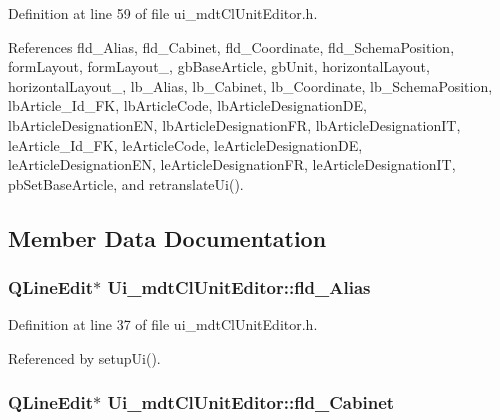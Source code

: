 Definition at line 59 of file ui\-\_\-mdt\-Cl\-Unit\-Editor.\-h.



References fld\-\_\-\-Alias, fld\-\_\-\-Cabinet, fld\-\_\-\-Coordinate, fld\-\_\-\-Schema\-Position, form\-Layout, form\-Layout\-\_, gb\-Base\-Article, gb\-Unit, horizontal\-Layout, horizontal\-Layout\-\_, lb\-\_\-\-Alias, lb\-\_\-\-Cabinet, lb\-\_\-\-Coordinate, lb\-\_\-\-Schema\-Position, lb\-Article\-\_\-\-Id\-\_\-\-F\-K, lb\-Article\-Code, lb\-Article\-Designation\-D\-E, lb\-Article\-Designation\-E\-N, lb\-Article\-Designation\-F\-R, lb\-Article\-Designation\-I\-T, le\-Article\-\_\-\-Id\-\_\-\-F\-K, le\-Article\-Code, le\-Article\-Designation\-D\-E, le\-Article\-Designation\-E\-N, le\-Article\-Designation\-F\-R, le\-Article\-Designation\-I\-T, pb\-Set\-Base\-Article, and retranslate\-Ui().



\subsection{Member Data Documentation}
\hypertarget{class_ui__mdt_cl_unit_editor_a1cc230a41daf066bb90d542c4618b8e5}{
\subsubsection[{fld\-\_\-\-Alias}]{\setlength{\rightskip}{0pt plus 5cm}Q\-Line\-Edit$\ast$ Ui\-\_\-mdt\-Cl\-Unit\-Editor\-::fld\-\_\-\-Alias}}\label{class_ui__mdt_cl_unit_editor_a1cc230a41daf066bb90d542c4618b8e5}


Definition at line 37 of file ui\-\_\-mdt\-Cl\-Unit\-Editor.\-h.



Referenced by setup\-Ui().

\hypertarget{class_ui__mdt_cl_unit_editor_a3f3a78ce3859fd6ab6bc260b5d8b6219}{
\subsubsection[{fld\-\_\-\-Cabinet}]{\setlength{\rightskip}{0pt plus 5cm}Q\-Line\-Edit$\ast$ Ui\-\_\-mdt\-Cl\-Unit\-Editor\-::fld\-\_\-\-Cabinet}}\label{class_ui__mdt_cl_unit_editor_a3f3a78ce3859fd6ab6bc260b5d8b6219}


